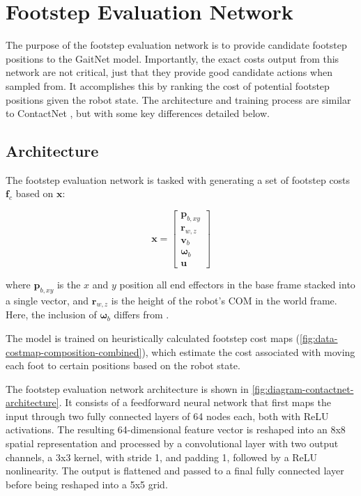 \section{Footstep Evaluation Network}

The purpose of the footstep evaluation network is to provide
candidate footstep positions to the GaitNet model. Importantly,
the exact costs output from this network are not critical, just that
they provide good candidate actions when sampled from. It accomplishes
this by ranking the cost of potential footstep positions given the
robot state. The architecture and training process are similar to
ContactNet \cite{bratta_contactnet_2024}, but with some key differences
detailed below.

\subsection{Architecture}

The footstep evaluation network is tasked with generating a set of
footstep costs $\mathbf f_c$ based on $\mathbf x$:

\[
  \mathbf{x} =
  \begin{bmatrix}
    \mathbf p_{b,xy} \\
    \mathbf r_{w,z} \\
    \mathbf v_b \\
    \mathbf \omega_b \\
    \mathbf u
  \end{bmatrix}
\]

where
$\mathbf p_{b,xy}$ is the $x$ and $y$ position all end effectors in
the base frame stacked into a single vector, and
$\mathbf r_{w,z}$ is the height of the robot's COM in the world frame.
Here, the inclusion of $\mathbf \omega_b$ differs from
\cite{bratta_contactnet_2024}.

The model is trained on heuristically calculated footstep
cost maps (\autoref{fig:data-costmap-composition-combined}), which estimate
the cost associated with moving each foot to certain positions based on the
robot state.

The footstep evaluation network architecture is shown in
\autoref{fig:diagram-contactnet-architecture}. It consists of a
feedforward neural
network that first maps the input through two fully connected layers
of 64 nodes each, both with ReLU activations. The resulting 64-dimensional
feature vector is reshaped into an 8x8 spatial representation and
processed by a convolutional layer with two output channels, a
3x3 kernel, with stride 1, and padding 1, followed by a ReLU
nonlinearity. The output is flattened and passed to a final
fully connected layer before being reshaped into a 5x5 grid.

